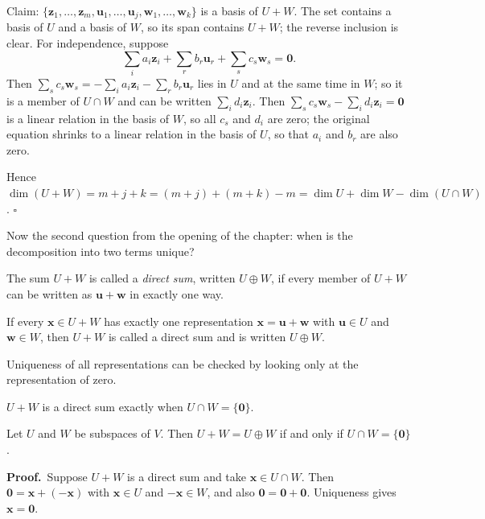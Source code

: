 Claim: $\{\mathbf{z}_{1},\dots,\mathbf{z}_{m},\mathbf{u}_{1},\dots,\mathbf{u}_{j},
\mathbf{w}_{1},\dots,\mathbf{w}_{k}\}$ is a basis of $U+W$. The set contains a basis of $U$ and a
basis of $W$, so its span contains $U+W$; the reverse inclusion is clear. For independence,
suppose
\[
  \sum_{i}a_{i}\mathbf{z}_{i}+\sum_{r}b_{r}\mathbf{u}_{r}
  +\sum_{s}c_{s}\mathbf{w}_{s}=\mathbf{0}.
\]
Then $\sum_{s}c_{s}\mathbf{w}_{s}=-\sum_{i}a_{i}\mathbf{z}_{i}-\sum_{r}b_{r}\mathbf{u}_{r}$
lies in $U$ and at the same time in $W$; so it is a member of $U\cap W$ and can be written
$\sum_{i}d_{i}\mathbf{z}_{i}$. Then $\sum_{s}c_{s}\mathbf{w}_{s}-\sum_{i}d_{i}\mathbf{z}_{i}
=\mathbf{0}$ is a linear relation in the basis of $W$, so all $c_{s}$ and $d_{i}$ are zero; the
original equation shrinks to a linear relation in the basis of $U$, so that $a_{i}$ and $b_{r}$
are also zero.

Hence $\dim(U+W)=m+j+k=(m+j)+(m+k)-m=\dim U+\dim W-\dim(U\cap W)$.
\hfill$\square$\par\medskip

Now the second question from the opening of the chapter: when is the decomposition into two terms
unique?

The sum $U+W$ is called a \emph{direct sum}, written $U\oplus W$, if every member of
$U+W$ can be written as $\mathbf{u}+\mathbf{w}$ in exactly one way.

\begin{definisi}
If every $\mathbf{x}\in U+W$ has exactly one representation
$\mathbf{x}=\mathbf{u}+\mathbf{w}$ with $\mathbf{u}\in U$ and $\mathbf{w}\in W$, then
$U+W$ is called a direct sum and is written $U\oplus W$.
\end{definisi}

Uniqueness of all representations can be checked by looking only at the representation of zero.

$U+W$ is a direct sum exactly when $U\cap W=\{\mathbf{0}\}$.

\begin{teorema}
Let $U$ and $W$ be subspaces of $V$. Then $U+W=U\oplus W$ if and only if
$U\cap W=\{\mathbf{0}\}$.
\end{teorema}

\par\medskip\noindent\textbf{Proof.}\ 
Suppose $U+W$ is a direct sum and take $\mathbf{x}\in U\cap W$. Then
$\mathbf{0}=\mathbf{x}+(-\mathbf{x})$ with $\mathbf{x}\in U$ and $-\mathbf{x}\in W$, and also
$\mathbf{0}=\mathbf{0}+\mathbf{0}$. Uniqueness gives $\mathbf{x}=\mathbf{0}$.

